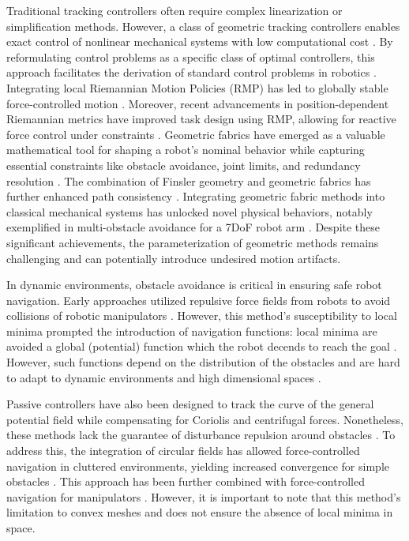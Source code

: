 Traditional tracking controllers often require complex linearization or simplification methods. However, a class of geometric tracking controllers enables exact control of nonlinear mechanical systems with low computational cost \cite{udwadia2003new}. By reformulating control problems as a specific class of optimal controllers, this approach facilitates the derivation of standard control problems in robotics \cite{peters2008unifying}.
Integrating local Riemannian Motion Policies (RMP) has led to globally stable force-controlled motion \cite{cheng2020rmp}. Moreover, recent advancements in position-dependent Riemannian metrics have improved task design using RMP, allowing for reactive force control under constraints \cite{bylard2021composable}.
Geometric fabrics have emerged as a valuable mathematical tool for shaping a robot's nominal behavior while capturing essential constraints like obstacle avoidance, joint limits, and redundancy resolution \cite{xie2020geometric}. The combination of Finsler geometry and geometric fabrics has further enhanced path consistency \cite{ratliff2021generalized}.
Integrating geometric fabric methods into classical mechanical systems has unlocked novel physical behaviors, notably exemplified in multi-obstacle avoidance for a 7DoF robot arm \cite{van2022geometric}. Despite these significant achievements, the parameterization of geometric methods remains challenging and can potentially introduce undesired motion artifacts.

In dynamic environments, obstacle avoidance is critical in ensuring safe robot navigation. Early approaches utilized repulsive force fields from robots to avoid collisions of robotic manipulators \cite{khatib1987unified}. 
However, this method's susceptibility to local minima prompted the introduction of navigation functions: local minima are avoided a global (potential) function which the robot decends to reach the goal \cite{koditschek1990robot}. However, such functions depend on the distribution of the obstacles and are hard to adapt to dynamic environments and high dimensional spaces \cite{loizou2022mobile}.

Passive controllers have also been designed to track the curve of the general potential field while compensating for Coriolis and centrifugal forces. Nonetheless, these methods lack the guarantee of disturbance repulsion around obstacles \cite{duindam2004passive}. To address this, the integration of circular fields \cite{singh1996real} has allowed force-controlled navigation in cluttered environments, yielding increased convergence for simple obstacles \cite{haddadin2011dynamic}. This approach has been further combined with force-controlled navigation for manipulators \cite{tulbure2020closing}. 
However, it is important to note that this method's limitation to convex meshes and does not ensure the absence of local minima in space.

